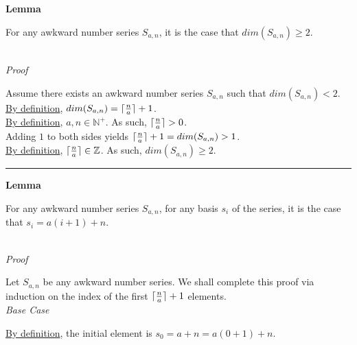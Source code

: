 \documentclass[a4paper,12pt]{article}
\DeclarePairedDelimiter{\ceil}{\lceil}{\rceil}
\begin{document}
\label{lemma:min_dimension}
\hypertarget{lemma:min_dimension}{}
\begin{tcolorbox}
\textbf{Lemma}

For any awkward number series $S_{a, n}$, it is the case that $dim(S_{a, n}) \geq 2$.

\end{tcolorbox}

\noindent \\
\textit{Proof}

\noindent Assume there exists an awkward number series $S_{a, n}$ such that $dim(S_{a, n}) < 2$.\\

\noindent \hyperlink{definition:dimension}{By definition}, $dim(S_{a, n}) = \ceil{\frac{n}{a}} + 1$.\\

\noindent \hyperlink{definition:awkward_number_series}{By definition}, $a, n \in \mathbb{N}^+$. As such, $\ceil{\frac{n}{a}} > 0$.\\

\noindent Adding $1$ to both sides yields $\ceil{\frac{n}{a}} + 1 = dim(S_{a, n}) > 1$.\\

\noindent \hyperlink{definition:ceiling_function}{By definition}, $\ceil{\frac{n}{a}} \in \mathbb{Z}$. As such, $dim(S_{a, n}) \geq 2$. 



\begin{center}
\noindent\rule{8cm}{0.4pt}
\end{center}








\label{lemma:basis_lengths}
\hypertarget{lemma:basis_lengths}{}
\begin{tcolorbox}
\textbf{Lemma}

For any awkward number series $S_{a,n}$, for any basis $s_i$ of the series, it is the case that $s_i = a(i + 1) + n$.
\end{tcolorbox}

\noindent \\
\textit{Proof}

\noindent Let $S_{a,n}$ be any awkward number series. We shall complete this proof via induction on the index of the first $\ceil{\frac{n}{a}} + 1$ elements.\\


\noindent
\textit{Base Case}

\noindent \hyperlink{definition:awkward_number_series}{By definition}, the initial element is $s_0 = a + n = a(0 + 1) + n$.\\
\end{document}
